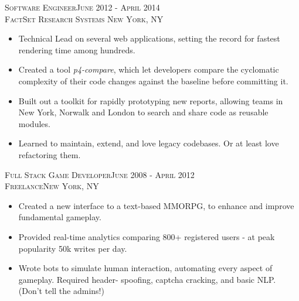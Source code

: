 \documentclass[oneside, final]{scrartcl}
\begin{document}
\begin{center}
\textsc{Software Engineer\hfill June 2012 - April 2014\\}
\textsc{FactSet Research Systems \hfill New York, NY\\}
\begin{itemize}
	\setlength{\itemsep}{1pt}
	\setlength{\parskip}{0pt}
	\setlength{\parsep}{0pt}
	\setlength{\leftmargin}{-5mm}
	\item Technical Lead on several web applications, setting the record for fastest rendering time among hundreds.
	\item Created a tool \textit{p4-compare}, which let developers compare the cyclomatic complexity of their code
	changes against the baseline before committing it.
	\item Built out a toolkit for rapidly prototyping new reports, allowing teams in New York, Norwalk and London to search and share code as reusable modules.
	\item Learned to maintain, extend, and love legacy codebases. Or at least love refactoring them.
\end{itemize}


\textsc{Full Stack Game Developer\hfill June 2008 - April 2012\\}
\textsc{Freelance\hfill New York, NY\\}
\begin{itemize}
	\setlength{\itemsep}{1pt}
	\setlength{\parskip}{0pt}
	\setlength{\parsep}{0pt}
	\setlength{\leftmargin}{-5mm}
	\item Created a new interface to a text-based MMORPG, to enhance and improve fundamental gameplay.
    \item Provided real-time analytics comparing 800+ registered users - at peak popularity 50k writes per day.
    \item Wrote bots to simulate human interaction, automating every aspect of gameplay. Required header-
            spoofing, captcha cracking, and basic NLP. (Don’t tell the admins!)
\end{itemize}



\end{center}
\end{document}
